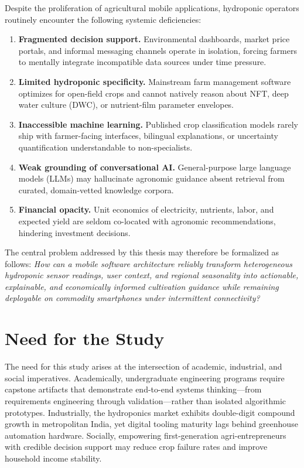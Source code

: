 Despite the proliferation of agricultural mobile applications, hydroponic operators routinely encounter the following systemic deficiencies:

\begin{enumerate}
  \item \textbf{Fragmented decision support.} Environmental dashboards, market price portals, and informal messaging channels operate in isolation, forcing farmers to mentally integrate incompatible data sources under time pressure.
  \item \textbf{Limited hydroponic specificity.} Mainstream farm management software optimizes for open-field crops and cannot natively reason about NFT, deep water culture (DWC), or nutrient-film parameter envelopes.
  \item \textbf{Inaccessible machine learning.} Published crop classification models rarely ship with farmer-facing interfaces, bilingual explanations, or uncertainty quantification understandable to non-specialists.
  \item \textbf{Weak grounding of conversational AI.} General-purpose large language models (LLMs) may hallucinate agronomic guidance absent retrieval from curated, domain-vetted knowledge corpora.
  \item \textbf{Financial opacity.} Unit economics of electricity, nutrients, labor, and expected yield are seldom co-located with agronomic recommendations, hindering investment decisions.
\end{enumerate}

The central problem addressed by this thesis may therefore be formalized as follows: \emph{How can a mobile software architecture reliably transform heterogeneous hydroponic sensor readings, user context, and regional seasonality into actionable, explainable, and economically informed cultivation guidance while remaining deployable on commodity smartphones under intermittent connectivity?}

\section{Need for the Study}
\label{sec:need}

The need for this study arises at the intersection of academic, industrial, and social imperatives. Academically, undergraduate engineering programs require capstone artifacts that demonstrate end-to-end systems thinking---from requirements engineering through validation---rather than isolated algorithmic prototypes. Industrially, the hydroponics market exhibits double-digit compound growth in metropolitan India, yet digital tooling maturity lags behind greenhouse automation hardware. Socially, empowering first-generation agri-entrepreneurs with credible decision support may reduce crop failure rates and improve household income stability.

